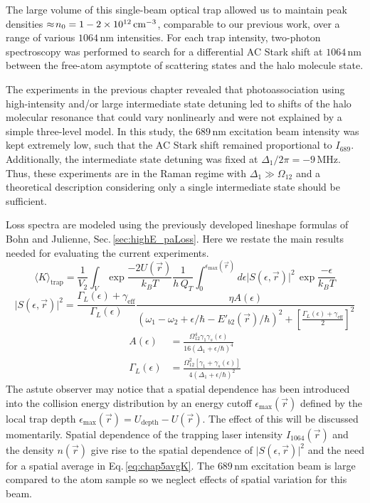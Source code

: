The large volume of this single-beam optical trap allowed us to maintain peak densities $\approx\!n_0 = 1-2 \times 10^{12} \, \text{cm}^{-3}$, comparable to our previous work, over a range of various $1064$\,nm intensities.
For each trap intensity, two-photon spectroscopy was performed to search for a differential AC Stark shift at $1064\,\text{nm}$ between the free-atom asymptote of scattering states and the halo molecule state.

The experiments in the previous chapter revealed that photoassociation using high-intensity and/or large intermediate state detuning led to shifts of the halo molecular resonance that could vary nonlinearly and were not explained by a simple three-level model.
In this study, the $689$\,nm excitation beam intensity was kept extremely low, such that the AC Stark shift remained proportional to $I_{689}$.
Additionally, the intermediate state detuning was fixed at $\Delta_1/2 \pi = -9$\,MHz.
Thus, these experiments are in the Raman regime with $\Delta_1 \gg \Omega_{12}$ and a theoretical description considering only a single intermediate state should be sufficient.


Loss spectra are modeled using the previously developed lineshape formulas of Bohn and Julienne, Sec.\,\ref{sec:highE_paLoss}.
Here we restate the main results needed for evaluating the current experiments.
\begingroup
\addtolength{\jot}{1em}
\begin{equation} \label{eq:chap5avgK}
	\langle K \rangle_\text{trap} = \frac{1}{V_2} \int_V \exp{\frac{-2 U(\vec{r})}{k_{B}T}} \frac{1}{h\,Q_{T}} \int_{0}^{\epsilon_{\text{max}}(\vec{r})} d\epsilon \vert S(\epsilon, \vec{r}) \vert^2 \,\exp{\frac{-\epsilon}{k_{B}T}}
\end{equation}
\begin{equation}\label{5equationApproxLorentzian}
  \vert S(\epsilon, \vec{r}) \vert^2 = \frac{\Gamma_L(\epsilon)+\gamma_{\text{eff}}}{\Gamma_L(\epsilon)} \frac{\eta  A(\epsilon)} {\left(\omega_1-\omega_2+\epsilon/\hbar-E'_{b2}(\vec{r})/\hbar\right)^2+\left[
  	\frac{\Gamma_L(\epsilon)+\gamma_{\text{eff}}}{2}\right]^2}
\end{equation}
\begin{align}
  A(\epsilon) &= \frac{\Omega_{12}^{4}\gamma_1 \gamma_s(\epsilon)}{16(\Delta_1+\epsilon/\hbar)^4} \\
  \Gamma_L(\epsilon) &= \frac{\Omega_{12}^{2}[\gamma_1 +\gamma_s(\epsilon)]}{4(\Delta_1+\epsilon/\hbar)^2}
\end{align}
\endgroup
The astute observer may notice that a spatial dependence has been introduced into the collision energy distribution by an energy cutoff $\epsilon_{\text{max}}(\vec{r})$ defined by the local trap depth $\epsilon_{\text{max}}(\vec{r}) = U_{\text{depth}} - U(\vec{r})$.
The effect of this will be discussed momentarily.
Spatial dependence of the trapping laser intensity $I_{1064}(\vec{r})$ and the density $n(\vec{r})$ give rise to the spatial dependence of $\vert S(\epsilon, \vec{r}) \vert^2$ and the need for a spatial average in Eq.\,\ref{eq:chap5avgK}.
The $689$\,nm excitation beam is large compared to the atom sample so we neglect effects of spatial variation for this beam.

